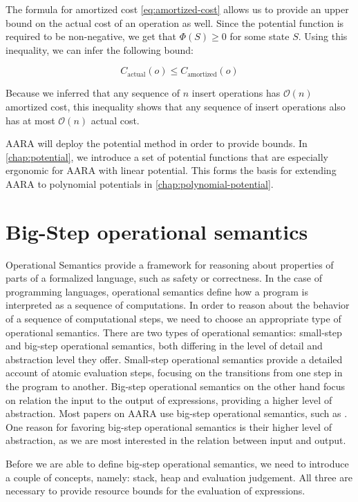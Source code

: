The formula for amortized cost \ref{eq:amortized-cost} allows us to provide an upper bound on the actual cost of an operation as well. Since the potential function is required to be non-negative, we get that \(\Phi(S) \geq 0\) for some state \(S\). Using this inequality, we can infer the following bound: 

\[C_{\text{actual}}(o) \leq C_{\text{amortized}}(o)\]
\label{ineq:actual-amortized}

Because we inferred that any sequence of \(n\) insert operations has \(\mathcal{O}(n)\) amortized cost, this inequality shows that any sequence of insert operations also has at most \(\mathcal{O}(n)\) actual cost.

AARA will deploy the potential method in order to provide bounds. In \ref{chap:potential}, we introduce a set of potential functions that are especially ergonomic for AARA with linear potential.
 This forms the basis for extending AARA to polynomial potentials in \ref{chap:polynomial-potential}.

\section{Big-Step operational semantics}
Operational Semantics provide a framework for reasoning about properties of parts of a formalized language, such as safety or correctness. In the case of programming languages, operational semantics define how a program is interpreted as a sequence of computations. In order to reason about the behavior of a sequence of computational steps, we need to choose an appropriate type of operational semantics.
There are two types of operational semantics: small-step and big-step operational semantics, both differing in the level of detail and abstraction level they offer. Small-step operational semantics provide a detailed account of atomic evaluation steps, focusing on the transitions from one step in the program to another. Big-step operational semantics on the other hand focus on relation the input to the output of expressions, providing a higher level of abstraction. Most papers on AARA use big-step operational semantics, such as . One reason for favoring big-step operational semantics is their higher level of abstraction, as we are most interested in the relation between input and output.

Before we are able to define big-step operational semantics, we need to introduce a couple of concepts, namely: stack, heap and evaluation judgement. All three are necessary to provide resource bounds for the evaluation of expressions.

